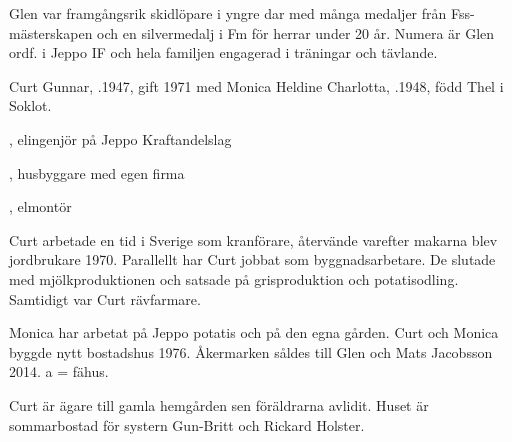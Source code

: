 Glen var framgångsrik skidlöpare i yngre dar med många medaljer från Fss-mästerskapen och en silvermedalj i Fm för herrar under 20 år. Numera är Glen ordf. i Jeppo IF och hela familjen engagerad i träningar och tävlande.






Curt Gunnar, .1947, gift 1971 med Monica Heldine Charlotta, .1948, född Thel i Soklot.
\begin{jhchildren}
  \item {}, elingenjör på Jeppo Kraftandelslag
  \item {}, husbyggare med egen firma
  \item {}, elmontör
\end{jhchildren}

Curt arbetade en tid i Sverige som kranförare, återvände varefter makarna blev jordbrukare 1970. Parallellt har Curt jobbat som byggnadsarbetare. De slutade med mjölkproduktionen och satsade på grisproduktion och potatisodling. Samtidigt var Curt rävfarmare.

Monica har 	arbetat på Jeppo potatis och på den egna gården. Curt och Monica byggde nytt bostadshus 1976. Åkermarken såldes till Glen och Mats Jacobsson 2014. a = fähus.






Curt är ägare till gamla hemgården sen föräldrarna avlidit. Huset är sommarbostad för systern Gun-Britt och Rickard Holster.\jhvspace{}



